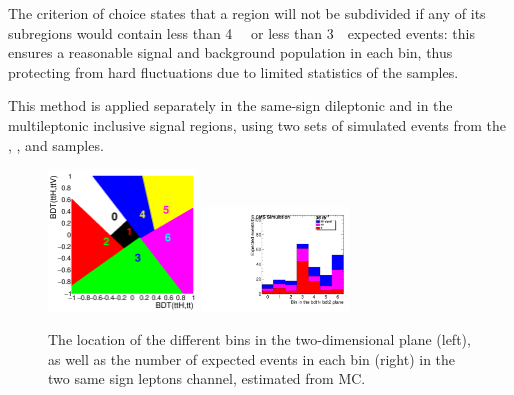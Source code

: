The criterion of choice states that a region will not be subdivided if any of its subregions would contain less than 4~\ttH
~or less than 3~\ttbar~expected events: this ensures a reasonable signal and background population in each bin, thus protecting from hard fluctuations due to limited statistics of the samples.

This method is applied separately in the same-sign dileptonic and in the multileptonic inclusive signal regions, using two sets of simulated events from the \ttH, \ttW, and \ttbar samples.


\begin{figure}[htb]
	\centering
        \includegraphics[width=0.35\textwidth]{plots_extraction/binning/2lss/voronoi_2l}
        \includegraphics[width=0.35\textwidth,height=0.35\textwidth]{plots_extraction/binning/2lss/recursive_2l}
        \caption{The location of the different bins in the two-dimensional plane (left), as well as the number of expected events in each bin (right) in the two same sign leptons channel, estimated from MC.}
	\label{fig:2l_2dbinning}
\end{figure}


